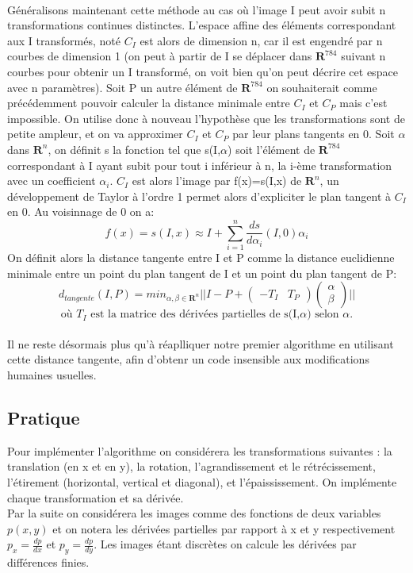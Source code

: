 \documentclass[a4paper,11pt,twoside]{report}
\begin{document}
 \\
Généralisons maintenant cette méthode au cas où l'image I peut avoir subit n transformations continues distinctes. L'espace affine des éléments correspondant aux I transformés, noté $C_{I}$ est alors de dimension n, car il est engendré par n courbes de dimension 1 (on peut à partir de I se déplacer dans $\textbf{R}^{784}$ suivant n courbes pour obtenir un I transformé, on voit bien qu'on peut décrire cet espace avec n paramètres). Soit P un autre élément de $\textbf{R}^{784}$ on souhaiterait comme précédemment pouvoir calculer la distance minimale entre $C_{I}$ et $C_{P}$ mais c'est impossible. On utilise donc à nouveau l'hypothèse que les transformations sont de petite ampleur, et on va approximer $C_{I}$ et $C_{P}$ par leur plans tangents en 0. Soit $\alpha$ dans $\textbf{R}^{n}$, on définit s la fonction tel que s(I,$\alpha$) soit l'élément de $\textbf{R}^{784}$ correspondant à I ayant subit pour tout i inférieur à n, la i-ème transformation avec un coefficient $\alpha_{i}$. $C_{I}$ est alors l'image par f(x)=s(I,x) de $\textbf{R}^{n}$, un développement de Taylor à l'ordre 1 permet alors d'expliciter le plan tangent à $C_{I}$ en 0. Au voisinnage de 0 on a:$$f(x) = s(I,x) \approx I + \sum_{i=1}^{n}\frac{ds}{d\alpha_{i}}(I,0)\alpha_{i}$$ On définit alors la distance tangente entre I et P comme la distance euclidienne minimale entre un point du plan tangent de I et un point du plan tangent de P:$$d_{tangente}(I,P)=min_{\alpha,\beta \in \textbf{R}^{n}}||I-P+\begin{pmatrix}-T_{I} & T_{P}\end{pmatrix} \begin{pmatrix}\alpha \\ \beta\end{pmatrix}||$$ $$\textrm{où $T_{I}$ est la matrice des dérivées partielles de s(I,$\alpha$) selon $\alpha$.}$$\\
Il ne reste désormais plus qu'à réaplliquer notre premier algorithme en utilisant cette distance tangente, afin d'obtenr un code insensible aux modifications humaines usuelles.

\subsection{Pratique}

Pour implémenter l'algorithme on considérera les transformations suivantes : la translation (en x et en y), la rotation, l'agrandissement et le rétrécissement, l'étirement (horizontal, vertical et diagonal), et l'épaississement. On implémente chaque transformation et sa dérivée.\\
Par la suite on considérera les images comme des fonctions de deux variables $p(x,y)$ et on notera les dérivées partielles par rapport à x et y respectivement $p_x = \frac{dp}{dx}$ et $p_y = \frac{dp}{dy}$. Les images étant discrètes on calcule les dérivées par différences finies. 
\end{document}

